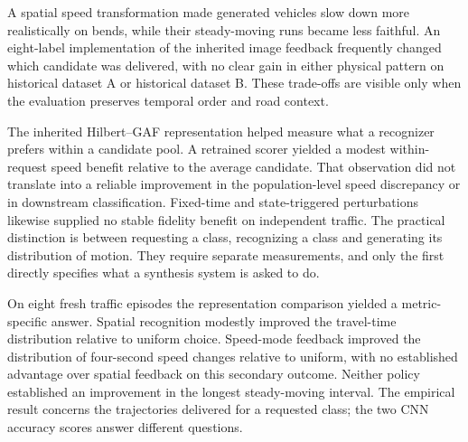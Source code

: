 A spatial speed transformation made generated vehicles slow down more realistically on bends, while their steady-moving runs became less faithful. An eight-label implementation of the inherited image feedback frequently changed which candidate was delivered, with no clear gain in either physical pattern on historical dataset A or historical dataset B. These trade-offs are visible only when the evaluation preserves temporal order and road context.

The inherited Hilbert--GAF representation helped measure what a recognizer prefers within a candidate pool. A retrained scorer yielded a modest within-request speed benefit relative to the average candidate. That observation did not translate into a reliable improvement in the population-level speed discrepancy or in downstream classification. Fixed-time and state-triggered perturbations likewise supplied no stable fidelity benefit on independent traffic. The practical distinction is between requesting a class, recognizing a class and generating its distribution of motion. They require separate measurements, and only the first directly specifies what a synthesis system is asked to do.

On eight fresh traffic episodes the representation comparison yielded a metric-specific answer. Spatial recognition modestly improved the travel-time distribution relative to uniform choice. Speed-mode feedback improved the distribution of four-second speed changes relative to uniform, with no established advantage over spatial feedback on this secondary outcome. Neither policy established an improvement in the longest steady-moving interval. The empirical result concerns the trajectories delivered for a requested class; the two CNN accuracy scores answer different questions.
